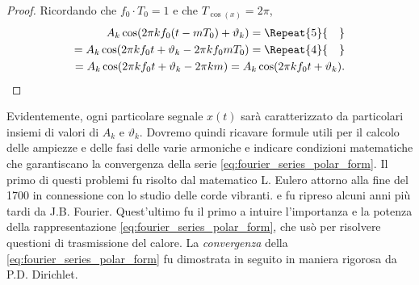 \documentclass[12pt,oneside,openany]{memoir}
\numberwithin{equation}{subsection}
\newcommand{\quads}[1]{\Repeat{#1}{\quad}}
\begin{document}
\begin{proof}
Ricordando che $f_0 \cdot T_0 = 1$ e che $T_{\cos(x)} = 2\pi$,
\begin{equation}
\begin{split}
	A_k \cos(2 \pi k f_0 (t - mT_0) + \vartheta_k) =
	\quads{5}
	\\
	= A_k \cos(2 \pi k f_0 t + \vartheta_k - 2 \pi k f_0 m T_0) =
	\quads{4}
	\\
	= A_k \cos(2 \pi k f_0 t + \vartheta_k - 2 \pi k m) = A_k \cos(2 \pi k f_0 t + \vartheta_k).
\end{split}
\end{equation}
\end{proof}
Evidentemente, ogni particolare segnale $x(t)$ sar\`a caratterizzato da particolari insiemi di valori di $A_k$ e $\vartheta_k$. Dovremo quindi ricavare formule utili per il calcolo delle ampiezze e delle fasi delle varie armoniche e indicare condizioni matematiche che garantiscano la convergenza della serie \eqref{eq:fourier_series_polar_form}. Il primo di questi problemi fu risolto dal matematico L. Eulero attorno alla fine del 1700 in connessione con lo studio delle corde vibranti. e fu ripreso alcuni anni pi\`u tardi da J.B. Fourier. Quest'ultimo fu il primo a intuire l'importanza e la potenza della rappresentazione \eqref{eq:fourier_series_polar_form}, che us\`o per risolvere questioni di trasmissione del calore. La \textit{convergenza} della \eqref{eq:fourier_series_polar_form} fu dimostrata in seguito in maniera rigorosa da P.D. Dirichlet.
\end{document}
